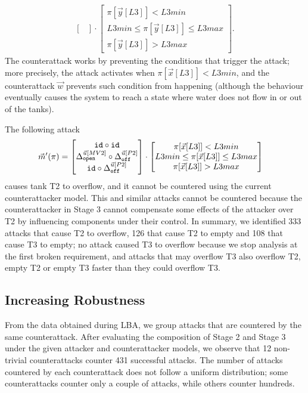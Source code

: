 {{\begin{align*}
\begin{bmatrix}
  \end{bmatrix}
  \cdot
  \begin{bmatrix}
    \pi[\vec{y}[L3]]<L3min \\
    L3min \leq \pi[\vec{y}[L3]]\leq L3max \\
    \pi[\vec{y}[L3]]>L3max
  \end{bmatrix}.
\end{align*} 
The counterattack works by preventing the conditions that trigger the attack; more precisely, the attack activates when $\pi[\vec{x}[L3]]<L3min$, and the counterattack $\vec{w}$ prevents such condition from happening (although the behaviour eventually causes the system to reach a state where water does not flow in or out of the tanks). 

The following attack
\begin{align*}
    \vec{m}'(\pi)&=
    \begin{bmatrix}
     {\texttt{id}}\circ {\texttt{id}} \\
     {\Delta}^{\vec{u}[MV2]}_{\texttt{open}}\circ {\Delta}^{\vec{u}[P2]}_{\texttt{off}} \\
     {\texttt{id}}\circ {\Delta}^{\vec{u}[P2]}_{\texttt{off}} \\
    \end{bmatrix}
    \cdot
    \begin{bmatrix}
      \pi[\vec{x}[L3]]<L3min \\
      L3min \leq \pi[\vec{x}[L3]]\leq L3max \\
      \pi[\vec{x}[L3]]>L3max
    \end{bmatrix}
  \end{align*} 
causes tank T2 to overflow, and it cannot be countered using the current counterattacker model. This and similar attacks cannot be countered because the counterattacker in Stage 3 cannot compensate some effects of the attacker over T2 by influencing components under their control. In summary, we identified 333 attacks that cause T2 to overflow, 126 that cause T2 to empty and 108 that cause T3 to empty; no attack caused T3 to overflow because we stop analysis at the first broken requirement, and attacks that may overflow T3 also overflow T2, empty T2 or empty T3 faster than they could overflow T3.

\subsection{Increasing Robustness}
From the data obtained during LBA, we group attacks that are countered by the same counterattack. After evaluating the composition of Stage 2 and Stage 3 under the given attacker and counterattacker models, we observe that 12 non-trivial counterattacks counter 431 successful attacks. The number of attacks countered by each counterattack does not follow a uniform distribution; some counterattacks counter only a couple of attacks, while others counter hundreds. 

}}
